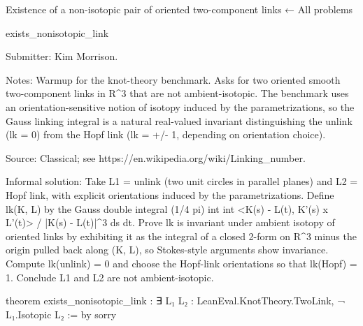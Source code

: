 Existence of a non-isotopic pair of oriented two-component links
← All problems

exists_nonisotopic_link

Submitter: Kim Morrison.

Notes: Warmup for the knot-theory benchmark. Asks for two oriented smooth two-component links in R^3 that are not ambient-isotopic. The benchmark uses an orientation-sensitive notion of isotopy induced by the parametrizations, so the Gauss linking integral is a natural real-valued invariant distinguishing the unlink (lk = 0) from the Hopf link (lk = +/- 1, depending on orientation choice).

Source: Classical; see https://en.wikipedia.org/wiki/Linking_number.

Informal solution: Take L1 = unlink (two unit circles in parallel planes) and L2 = Hopf link, with explicit orientations induced by the parametrizations. Define lk(K, L) by the Gauss double integral (1/4 pi) int int <K(s) - L(t), K'(s) x L'(t)> / |K(s) - L(t)|^3 ds dt. Prove lk is invariant under ambient isotopy of oriented links by exhibiting it as the integral of a closed 2-form on R^3 minus the origin pulled back along (K, L), so Stokes-style arguments show invariance. Compute lk(unlink) = 0 and choose the Hopf-link orientations so that lk(Hopf) = 1. Conclude L1 and L2 are not ambient-isotopic.

theorem exists_nonisotopic_link : ∃ L₁ L₂ : LeanEval.KnotTheory.TwoLink, ¬ L₁.Isotopic L₂ := by
  sorry